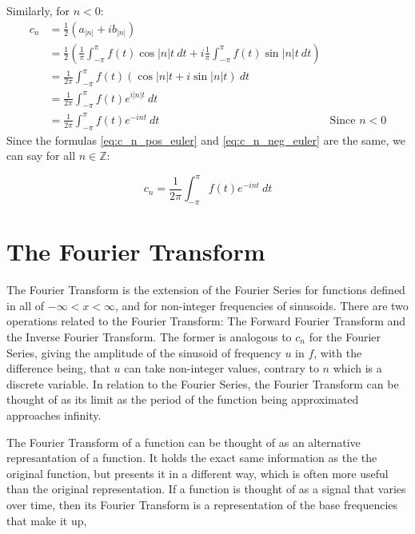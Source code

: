 \documentclass [12pt, titlepage]{article}
\numberwithin{equation}{section}
\let\oldsection\section
\renewcommand\section{\clearpage\oldsection}
\newcommand{\ahalf}{\frac{1}{2}}
\newcommand{\piint}{\int_{-\pi}^{\pi}} %
\begin{document}
Similarly, for $n < 0$:
%
\begin{align}
    c_n &= \ahalf(a_{|n|} + ib_{|n|}) \nonumber \\
        &= \ahalf \left(\frac{1}{\pi} \piint f(t)\cos{|n|t}\ dt 
            + i\frac{1}{\pi}\piint f(t)\sin{|n|t}\ dt \right) \nonumber \\
        &= \frac{1}{2\pi}\piint f(t) (\cos{|n|t} + i\sin{|n|t})\ dt \nonumber \\
        &= \frac{1}{2\pi}\piint f(t) e^{i|n|t}\ dt \nonumber \\
        &= \frac{1}{2\pi}\piint f(t) e^{-int}\ dt & \text{Since }n<0 \label{eq:c_n_neg_euler}
\end{align}
%
Since the formulas \eqref{eq:c_n_pos_euler} and \eqref{eq:c_n_neg_euler} are the same, we
can say for all $n \in \mathbb{Z}$:
\begin{mdframed}
    \begin{equation*}
        c_n = \frac{1}{2\pi}\piint f(t) e^{-int}\ dt
    \end{equation*}
\end{mdframed}


\section{The Fourier Transform}

The Fourier Transform is the extension of the Fourier Series for functions defined in all of
$-\infty < x < \infty$, and for non-integer frequencies of sinusoids. There are two
operations related to the Fourier Transform: The Forward Fourier Transform and the Inverse
Fourier Transform. The former is analogous to $c_n$ for the Fourier Series, giving the
amplitude of the sinusoid of frequency $u$ in $f$, with the difference being, that $u$ can
take non-integer values, contrary to $n$ which is a discrete variable. In relation to the
Fourier Series, the Fourier Transform can be thought of as its limit as the period of the
function being approximated approaches infinity.  \autocite{wolfram_fourier_transform} 

The Fourier Transform of a function can be thought of as an alternative represantation of
a function. It holds the exact same information as the the original function, but presents
it in a different way, which is often more useful than the original representation. If a
function is thought of as a signal that varies over time, then its Fourier Transform is a
representation of the base frequencies that make it up, 
\end{document}
